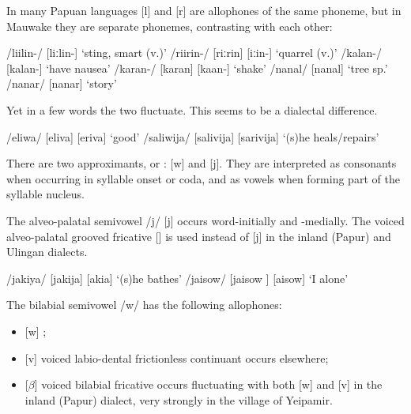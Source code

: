 In many Papuan languages [l] and [r] are allophones of the same phoneme, but in Mauwake they are separate phonemes, contrasting with each other:

\ea
\ea
/liilin-/  [liːlin-]  `sting, smart (v.)'
\ex
/riirin-/  [{{\textprimstress}riːrin}] {\Tilde} [{{\textprimstress}}{\textfishhookr}iː{\textfishhookr}in-]  `quarrel (v.)'
\ex
/kalan-/  [ka{{\textprimstress}lan}-]  `have nausea' 
\ex
/karan-/  [ka{{\textprimstress}ran}] {\Tilde} [ka{{\textprimstress}}{\textfishhookr}an-]  `shake'
\ex
/nanal/  [na{{\textprimstress}nal}]  `tree sp.'
\ex
/nanar/  [na{{\textprimstress}nar}]  `story'
\z
\z

Yet in a few words the two fluctuate. This seems to be a dialectal difference.

\ea
\ea
/eliwa/  [e{{\textprimstress}liva}] {\Tilde} [e{{\textprimstress}riva}]  `good'
\ex
/saliwija/  [sa{{\textprimstress}livija}] {\Tilde} [sa{{\textprimstress}rivija}]  `(s)he heals/repairs'
\z
\z 

There are two approximants, or : [w] and [j].  They are interpreted as consonants when occurring in syllable onset or coda, and as vowels when forming part of the syllable nucleus. 

The alveo-palatal semivowel /j/ [j] occurs word-initially and -medially. The voiced alveo-palatal grooved fricative [{\textyogh}] is used instead of [j] in the inland (Papur) and Ulingan dialects.

\ea
\ea
/jakiya/  [ja{{\textprimstress}kija}] {\Tilde} [{\textyogh}a{{\textprimstress}ki}{\textyogh}a]  `(s)he bathes'
\ex
/jaisow/  [{{\textprimstress}jaisow} ] {\Tilde} [{{\textprimstress}}{\textyogh}aisow]  `I alone' 
\z
\z

The bilabial semivowel /w/ has the following allophones:

\begin{itemize}
 \item{} [w]  ;
 \item{} [v]  voiced labio-dental frictionless continuant occurs elsewhere;
 \item{} [$\beta $]  voiced bilabial fricative occurs fluctuating with both [w] and [v] in the inland (Papur) dialect, very strongly in the village of Yeipamir.
\end{itemize}


